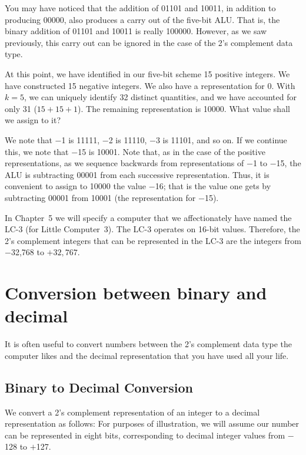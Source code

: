 \documentclass{patt}
\begin{document}
\enlargethispage{-\baselineskip}

You may have noticed that the addition of 01101 and 10011, in addition
to producing 00000, also produces a carry out of the five-bit ALU.\vadjust{\pagebreak}
That is, the binary addition of 01101 and 10011 is really 100000.
However, as we saw previously, this carry out can be ignored in the
case of the 2's complement data type.

At this point, we have identified in our five-bit scheme 15 positive
integers.  We have constructed 15 negative integers.  We also have a
representation for 0.  With $k=5$, we can uniquely identify 32
distinct quantities, and we have accounted for only 31 ($15+15+1$).
The remaining representation is 10000.  What value shall we assign to
it?

We note that $-$1 is 11111, $-$2 is 11110, $-$3 is 11101, and so on.
If we continue this, we note that $-$15 is 10001.  Note that, as in
the case of the positive representations, as we sequence backwards
from representations of $-$1 to $-$15, the ALU is subtracting 00001
from each successive representation.  Thus, it is convenient to assign
to 10000 the value $-$16; that is the value one gets by subtracting
00001 from 10001 (the representation for $-$15).

In Chapter~5 we will specify a computer that we affectionately have
named the LC-3 (for Little Computer~3). The LC-3 operates on 16-bit
values.  Therefore, the 2's complement integers that can be
represented in the LC-3 are the integers from $-$32{,}768 to
$+32{,}767$.

\enlargethispage{-\baselineskip}

\section{Conversion between binary and decimal}

It is often useful to convert numbers between the 2's complement data type
the computer likes and the decimal representation that you have used all 
your life.

\subsection{Binary to Decimal Conversion}

We convert a 2's complement representation of an integer 
 to
a decimal representation as follows: For purposes of illustration, we
will assume our number can be represented in eight bits,
corresponding to decimal integer values from $-$128 to $+$127.
\end{document}
